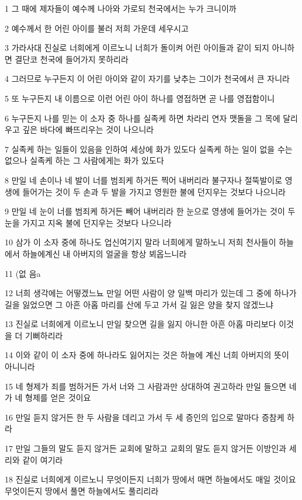 \par 1 그 때에 제자들이 예수께 나아와 가로되 천국에서는 누가 크니이까
\par 2 예수께서 한 어린 아이를 불러 저희 가운데 세우시고
\par 3 가라사대 진실로 너희에게 이르노니 너희가 돌이켜 어린 아이들과 같이 되지 아니하면 결단코 천국에 들어가지 못하리라
\par 4 그러므로 누구든지 이 어린 아이와 같이 자기를 낮추는 그이가 천국에서 큰 자니라
\par 5 또 누구든지 내 이름으로 이런 어린 아이 하나를 영접하면 곧 나를 영접함이니
\par 6 누구든지 나를 믿는 이 소자 중 하나를 실족케 하면 차라리 연자 맷돌을 그 목에 달리우고 깊은 바다에 빠뜨리우는 것이 나으니라
\par 7 실족케 하는 일들이 있음을 인하여 세상에 화가 있도다 실족케 하는 일이 없을 수는 없으나 실족케 하는 그 사람에게는 화가 있도다
\par 8 만일 네 손이나 네 발이 너를 범죄케 하거든 찍어 내버리라 불구자나 절뚝발이로 영생에 들어가는 것이 두 손과 두 발을 가지고 영원한 불에 던지우는 것보다 나으니라
\par 9 만일 네 눈이 너를 범죄케 하거든 빼어 내버리라 한 눈으로 영생에 들어가는 것이 두 눈을 가지고 지옥 불에 던지우는 것보다 나으니라
\par 10 삼가 이 소자 중에 하나도 업신여기지 말라 너희에게 말하노니 저희 천사들이 하늘에서 하늘에계신 내 아버지의 얼굴을 항상 뵈옵느니라
\par 11 (없 음a
\par 12 너희 생각에는 어떻겠느뇨 만일 어떤 사람이 양 일백 마리가 있는데 그 중에 하나가 길을 잃었으면 그 아흔 아홉 마리를 산에 두고 가서 길 잃은 양을 찾지 않겠느냐
\par 13 진실로 너희에게 이르노니 만일 찾으면 길을 잃지 아니한 아흔 아홉 마리보다 이것을 더 기뻐하리라
\par 14 이와 같이 이 소자 중에 하나라도 잃어지는 것은 하늘에 계신 너희 아버지의 뜻이 아니니라
\par 15 네 형제가 죄를 범하거든 가서 너와 그 사람과만 상대하여 권고하라 만일 들으면 네가 네 형제를 얻은 것이요
\par 16 만일 듣지 않거든 한 두 사람을 데리고 가서 두 세 증인의 입으로 말마다 증참케 하라
\par 17 만일 그들의 말도 듣지 않거든 교회에 말하고 교회의 말도 듣지 않거든 이방인과 세리와 같이 여기라
\par 18 진실로 너희에게 이르노니 무엇이든지 너희가 땅에서 매면 하늘에서도 매일 것이요 무엇이든지 땅에서 풀면 하늘에서도 풀리리라
